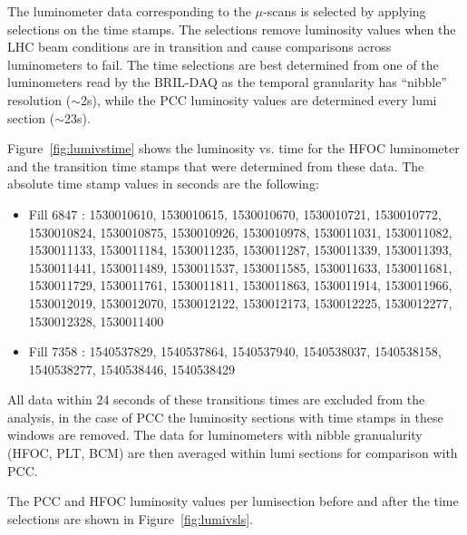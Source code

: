 
The luminometer data corresponding to the $\mu$-scans is selected by applying selections on the time stamps.
The selections remove luminosity values when the LHC beam conditions are in transition and cause comparisons across luminometers to fail.
The time selections are best determined from one of the luminometers read by the BRIL-DAQ as the temporal granularity has ``nibble'' resolution ($\sim$2s), while the PCC luminosity values are determined every lumi section ($\sim$23s).

Figure~\ref{fig:lumivstime} shows the luminosity vs. time for the HFOC luminometer and the transition time stamps that were determined from these data.
The absolute time stamp values in seconds are the following:
\begin{itemize}
\item Fill 6847 : 1530010610, 1530010615, 1530010670, 1530010721, 1530010772, 1530010824, 1530010875, 1530010926, 1530010978, 1530011031, 1530011082, 1530011133, 1530011184, 1530011235, 1530011287, 1530011339, 1530011393, 1530011441, 1530011489, 1530011537, 1530011585, 1530011633, 1530011681, 1530011729, 1530011761, 1530011811, 1530011863, 1530011914, 1530011966, 1530012019, 1530012070, 1530012122, 1530012173, 1530012225, 1530012277, 1530012328, 1530011400
\item Fill 7358 : 1540537829, 1540537864, 1540537940, 1540538037, 1540538158, 1540538277, 1540538446, 1540538429
\end{itemize}

All data  within 24 seconds of these transitions times are excluded from the analysis, in the case of PCC the luminosity sections with time stamps in these windows are removed.
The data for luminometers with nibble granualurity (HFOC, PLT, BCM) are then averaged within lumi sections for comparison with PCC. 

The PCC and HFOC luminosity values per lumisection before and after the time selections are shown in Figure~\ref{fig:lumivsls}.


